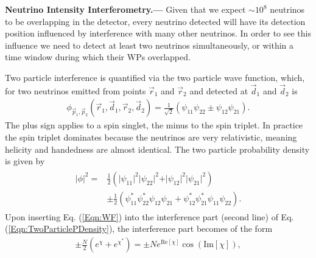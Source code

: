 \documentclass[aps,prl,reprint,floatfix
]{revtex4-1}
\newcommand{\heading}[1]{\textbf{#1.---}}
\begin{document}
\heading{Neutrino Intensity Interferometry}
Given that we expect $\sim10^{8}$ neutrinos to be overlapping in the detector, every neutrino detected will have its detection position influenced by interference with many other neutrinos. In order to see this influence we need to detect at least two neutrinos simultaneously, or within a time window during which their WPs overlapped.

Two particle interference is quantified via the two particle wave function, which, for two neutrinos emitted from points $\vec{r}_1$ and $\vec{r}_2$ and detected at $\vec{d}_1$ and $\vec{d}_2$ is 
\begin{align}
	\phi_{\vec{p}_1,\vec{p}_2}\left(\vec{r}_1,\vec{d}_1,\vec{r}_2,\vec{d}_2\right) = 
		\frac{1}{\sqrt{2}}\left(\psi_{11}\psi_{22} \pm\psi_{12}\psi_{21}\right).
    \label{Eqn:TwoParticleWF}
\end{align}
The plus sign applies to a spin singlet, the minus to the spin triplet. In practice the spin triplet dominates because the neutrinos are very relativistic, meaning helicity and handedness are almost identical. The two particle probability density is given by
\begin{align}\begin{aligned}
    \vert\phi\vert^2=&\frac{1}{2}\left(
        \vert\psi_{11}\vert^2\vert\psi_{22}\vert^2
        +\vert\psi_{12}\vert^2\vert\psi_{21}\vert^2
    \right)\\ &\pm\frac{1}{2}\left(
        \psi_{11}^*\psi_{22}^*\psi_{12}\psi_{21}
        +\psi_{12}^*\psi_{21}^*\psi_{11}\psi_{22}
    \right).
    \label{Eqn:TwoParticlePDensity}
\end{aligned}\end{align}
Upon inserting Eq. (\ref{Eqn:WF}) into the interference part (second line) of Eq. (\ref{Eqn:TwoParticlePDensity}), the interference part becomes of the form
\begin{align}
	\pm\frac{N}{2}\left(e^{\chi}+e^{\chi^*}\right)
    =\pm Ne^{\text{Re}\left[\chi\right]}
    	\cos\left(\text{Im}\left[\chi\right]\right)
    \label{Eqn:TwoParticlePDensityCos},
\end{align}
\end{document}

